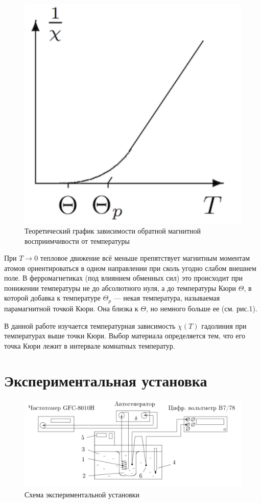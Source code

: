 \documentclass[a4paper,12pt]{article} %
\begin{document}
\begin{figure}[h!]
	\centering
	\includegraphics[scale=0.6]{Pictures/ТеорГраф.png}
	\caption{Теоретический график зависимости обратной магнитной восприимчивости от температуры}
\end{figure}

При $ T\to 0 $ тепловое движение всё меньше препятствует магнитным моментам атомов ориентироваться в одном направлении при сколь угодно слабом внешнем поле. В ферромагнетиках (под влиянием обменных сил) это происходит при понижении температуры не до абсолютного нуля, а до температуры Кюри $\Theta$, в которой добавка к температуре $\Theta_p$ --- некая температура, называемая парамагнитной точкой Кюри. Она близка к $\Theta$, но немного больше ее (см. рис.1).

В данной работе изучается температурная зависимость $ \chi(T) $ гадолиния
при температурах выше точки Кюри. Выбор материала определяется
тем, что его точка Кюри лежит в интервале комнатных температур.




\section*{Экспериментальная установка} 
\begin{figure}[h!]
	\centering
	\includegraphics[scale=0.6]{Pictures/Установка.png}
	\caption{Схема экспериментальной установки}
\end{figure}
\end{document}

